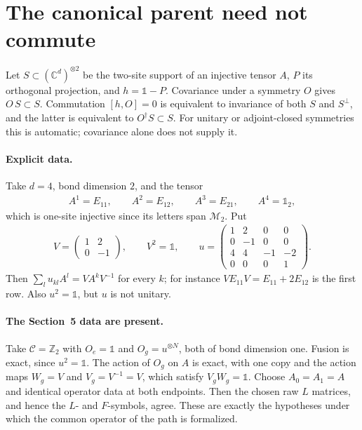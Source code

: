 \documentclass{article}
\begin{document}
\section{The canonical parent need not commute}
Let $S\subset(\mathbb C^d)^{\otimes2}$ be the two-site support of an
injective tensor $A$, $P$ its orthogonal projection, and $h=\mathbb 1-P$.
Covariance under a symmetry $O$ gives $O\,S\subset S$. Commutation
$[h,O]=0$ is equivalent to invariance of both $S$ and $S^\perp$, and the
latter is equivalent to $O^\dagger S\subset S$. For unitary or
adjoint-closed symmetries this is automatic; covariance alone does not
supply it.

\paragraph{Explicit data.} Take $d=4$, bond dimension $2$, and the tensor
\begin{align}
    A^1=E_{11},\qquad A^2=E_{12},\qquad A^3=E_{21},\qquad
    A^4=\mathbb 1_2,
    \label{eq:glm23_parent_commutation_tensor_letters}
\end{align}
which is one-site injective since its letters span $\mathcal M_2$. Put
\begin{align}
    V=\begin{pmatrix}1&2\\0&-1\end{pmatrix},\qquad V^2=\mathbb 1,
    \qquad
    u=\begin{pmatrix}
          1 & 2  & 0  & 0  \\
          0 & -1 & 0  & 0  \\
          4 & 4  & -1 & -2 \\
          0 & 0  & 0  & 1
      \end{pmatrix}.
    \label{eq:glm23_parent_commutation_gauge_and_symmetry}
\end{align}
Then $\sum_l u_{kl}A^l=VA^kV^{-1}$ for every $k$; for instance
$VE_{11}V=E_{11}+2E_{12}$ is the first row. Also $u^2=\mathbb 1$, but $u$ is
not unitary.

\paragraph{The Section~5 data are present.} Take $\mathcal C=\mathbb Z_2$
with $O_e=\mathbb 1$ and $O_g=u^{\otimes N}$, both of bond dimension one.
Fusion is exact, since $u^2=\mathbb 1$. The action of $O_g$ on $A$ is exact,
with one copy and the action maps $W_g=V$ and $V_g=V^{-1}=V$, which satisfy
$V_gW_g=\mathbb 1$. Choose $A_0=A_1=A$ and identical operator data at both
endpoints. Then the chosen raw $L$ matrices, and hence the $L$- and
$F$-symbols, agree. These are exactly the hypotheses under which the
common operator of the path is formalized.
\end{document}
